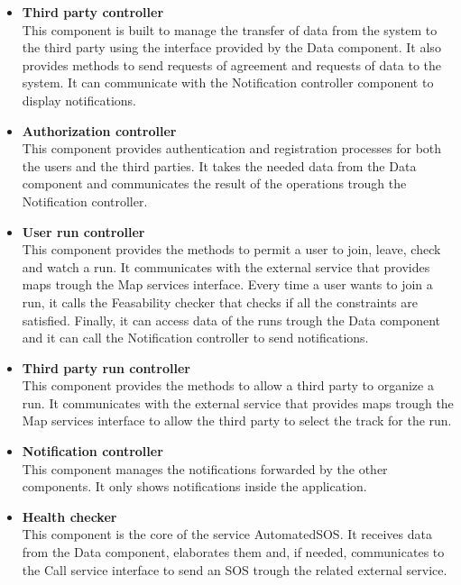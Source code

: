 \begin{legal}
\begin{itemize}
{				}\\
		\item{\textbf{Third party controller}\\
		This component is built to manage the transfer of data from the system to the third party using the interface provided by the Data component. It also provides methods to send requests of agreement and requests of data to the system. It can communicate with the Notification controller component to display notifications.
				}\\
		\item{\textbf{Authorization controller}\\
		This component provides authentication and registration processes for both the users and the third parties. It takes the needed data from the Data component and communicates the result of the operations trough the Notification controller.
				}\\
		\item{\textbf{User run controller}\\
		This component provides the methods to permit a user to join, leave, check and watch a run. It communicates with the external service that provides maps trough the Map services interface. Every time a user wants to join a run, it calls the Feasability checker that checks if all the constraints are satisfied. Finally, it can access data of the runs trough the Data component and it can call the Notification controller to send notifications.
				}\\
		\item{\textbf{Third party run controller}\\
		This component provides the methods to allow a third party to organize a run. It communicates with the external service that provides maps trough the Map services interface to allow the third party to select the track for the run.
				}\\				
		\item{\textbf{Notification controller}\\
		This component manages the notifications forwarded by the other components. It only shows notifications inside the application.
				}\\
		\item{\textbf{Health checker}\\
		This component is the core of the service AutomatedSOS. It receives data from the Data component, elaborates them and, if needed, communicates to the Call service interface to send an SOS trough the related external service.
}
\end{itemize}
\end{legal}
